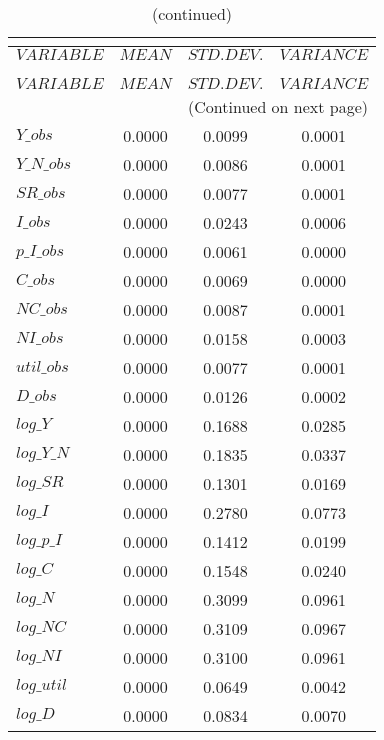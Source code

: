  
\begin{center}
\begin{longtable}{lccc} 
\caption{THEORETICAL MOMENTS}\\
 \label{Table:th_moments}\\
\toprule 
$VARIABLE   $	 & 	 $         MEAN$	 & 	 $    STD. DEV.$	 & 	 $     VARIANCE$\\
\midrule \endfirsthead 
\caption{(continued)}\\
 \toprule \\ 
$VARIABLE   $	 & 	 $         MEAN$	 & 	 $    STD. DEV.$	 & 	 $     VARIANCE$\\
\midrule \endhead 
\midrule \multicolumn{4}{r}{(Continued on next page)} \\ \bottomrule \endfoot 
\bottomrule \endlastfoot 
$Y\_obs     $	 & 	       0.0000	 & 	       0.0099	 & 	       0.0001 \\ 
$Y\_N\_obs  $	 & 	       0.0000	 & 	       0.0086	 & 	       0.0001 \\ 
$SR\_obs    $	 & 	       0.0000	 & 	       0.0077	 & 	       0.0001 \\ 
$I\_obs     $	 & 	       0.0000	 & 	       0.0243	 & 	       0.0006 \\ 
$p\_I\_obs  $	 & 	       0.0000	 & 	       0.0061	 & 	       0.0000 \\ 
$C\_obs     $	 & 	       0.0000	 & 	       0.0069	 & 	       0.0000 \\ 
$NC\_obs    $	 & 	       0.0000	 & 	       0.0087	 & 	       0.0001 \\ 
$NI\_obs    $	 & 	       0.0000	 & 	       0.0158	 & 	       0.0003 \\ 
$util\_obs  $	 & 	       0.0000	 & 	       0.0077	 & 	       0.0001 \\ 
$D\_obs     $	 & 	       0.0000	 & 	       0.0126	 & 	       0.0002 \\ 
$log\_Y     $	 & 	       0.0000	 & 	       0.1688	 & 	       0.0285 \\ 
$log\_Y\_N  $	 & 	       0.0000	 & 	       0.1835	 & 	       0.0337 \\ 
$log\_SR    $	 & 	       0.0000	 & 	       0.1301	 & 	       0.0169 \\ 
$log\_I     $	 & 	       0.0000	 & 	       0.2780	 & 	       0.0773 \\ 
$log\_p\_I  $	 & 	       0.0000	 & 	       0.1412	 & 	       0.0199 \\ 
$log\_C     $	 & 	       0.0000	 & 	       0.1548	 & 	       0.0240 \\ 
$log\_N     $	 & 	       0.0000	 & 	       0.3099	 & 	       0.0961 \\ 
$log\_NC    $	 & 	       0.0000	 & 	       0.3109	 & 	       0.0967 \\ 
$log\_NI    $	 & 	       0.0000	 & 	       0.3100	 & 	       0.0961 \\ 
$log\_util  $	 & 	       0.0000	 & 	       0.0649	 & 	       0.0042 \\ 
$log\_D     $	 & 	       0.0000	 & 	       0.0834	 & 	       0.0070 \\ 
\end{longtable}
 \end{center}
